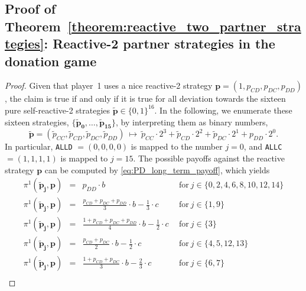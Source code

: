 \documentclass[9pt,twoside,lineno]{pnas-new}
\theoremstyle{plainCl1}
\theoremstyle{plainCl2}
\def\allc{\texttt{ALLC}}
\def\alld{\texttt{ALLD}}
\begin{document}

\subsection{Proof of Theorem~\ref{theorem:reactive_two_partner_strategies}: Reactive-2 partner strategies in the donation game}
\begin{proof}
Given that player~1 uses a nice reactive-2 strategy $\mathbf{p} = (1, p_{CD},p_{DC}, p_{DD})$, the claim is true if and only if it is true for all deviation towards the sixteen pure self-reactive-2 strategies $\mathbf{\tilde{p}}\!\in\!\{0,1\}^{16}$. 
In the following, we enumerate these sixteen strategies, $\{\mathbf{\tilde{p}_0}, \dots, \mathbf{\tilde{p}_{15}}\}$, 
by interpreting them as binary numbers, 
\begin{equation}
\mathbf{\tilde p} = (\tilde p_{CC}, \tilde p_{CD},\tilde p_{DC},\tilde p_{DD}) ~\mapsto~
\tilde p_{CC} \!\cdot\! 2^3 + \tilde p_{CD} \!\cdot\! 2^2 + \tilde p_{DC} \!\cdot\! 2^1 + p_{DD}\cdot 2^0. 
\end{equation}
In particular, \alld{} $=\!(0,0,0,0)$ is mapped to the number $j\!=\!0$, and \allc{} $=\!(1,1,1,1)$ is mapped to $j\!=\!15$. 
The possible payoffs against the reactive strategy $\mathbf{p}$ can be computed by \eqref{eq:PD_long_term_payoff}, which yields
\begin{equation*}\label{Eq:PayoffExpressionsReactiveTwo}
  \begin{array}{lcll}
   \pi^1(\mathbf{\tilde p_j},\mathbf{p}) &= &\displaystyle p_{DD}\cdot b & ~~\text{for}~ j\! \in\!  \{0, 2, 4, 6, 8, 10, 12, 14\} \\[0.3cm]
   \pi^1(\mathbf{\tilde p_j},\mathbf{p}) &= &\displaystyle  \frac{p_{CD} + p_{DC} + p_{DD}}{3}\cdot b - \frac{1}{3} \cdot c  & ~~\text{for}~ j\! \in\!  \{1, 9\} \\[0.3cm]
   \pi^1(\mathbf{\tilde p_j},\mathbf{p}) &= &\displaystyle  \frac{1+p_{CD} + p_{DC} + p_{DD} }{4}\cdot b - \frac{1}{2} \cdot c  & ~~\text{for}~ j\! \in\!  \{3\} \\[0.3cm]
   \pi^1(\mathbf{\tilde p_j},\mathbf{p}) &= &\displaystyle  \frac{p_{CD} + p_{DC}}{2}\cdot b - \frac{1}{2} \cdot c  & ~~\text{for}~ j\! \in\!  \{4, 5, 12, 13\} \\[0.3cm]
   \pi^1(\mathbf{\tilde p_j},\mathbf{p}) &= &\displaystyle  \frac{1+p_{CD} + p_{DC}}{3}\cdot b - \frac{2}{3} \cdot c  & ~~\text{for}~ j\! \in\!  \{6, 7\}\\[0.3cm]

\end{array}
\end{equation*}
\end{proof}
\end{document}
